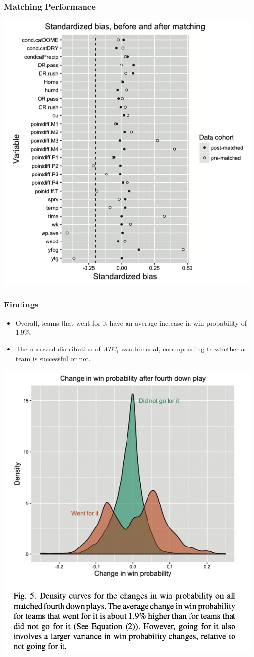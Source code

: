 \documentclass[t]{beamer}
\begin{document}
\begin{frame}
  \frametitle{Matching Performance}
  \centering \includegraphics[width=0.55\linewidth]{./love.png}
\end{frame}


\begin{frame}
  \frametitle{Findings}
  \begin{itemize}
  \item Overall, teams that went for it have an average increase in win probability of $1.9 \%$.
  \item The observed distribution of $ATC_i$ was bimodal, corresponding to whether a team is successful or not.
  \end{itemize}
  \centering  \includegraphics[width=0.4\linewidth]{./change_win_probability.png}
\end{frame}
\end{document}
